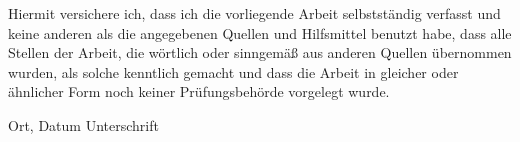 Hiermit versichere ich, dass ich die vorliegende Arbeit selbstständig verfasst und keine anderen als die angegebenen Quellen und Hilfsmittel benutzt habe, dass alle Stellen der Arbeit, die wörtlich oder sinngemäß aus anderen Quellen übernommen wurden, als solche kenntlich gemacht und dass die Arbeit in gleicher oder ähnlicher Form noch keiner Prüfungsbehörde vorgelegt wurde.

\vspace{3cm}
Ort, Datum \hspace{5cm} Unterschrift\\

